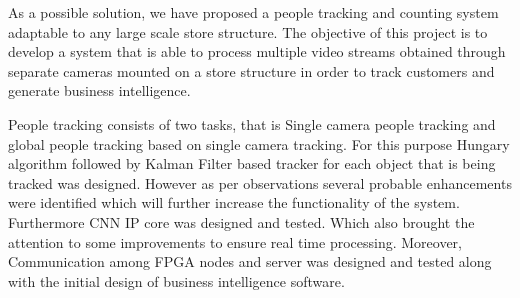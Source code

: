 \documentclass[12pt,a4paper]{report}
\begin{document}
\par As a possible solution, we have proposed a people tracking and counting system adaptable to any large scale store structure. The objective of this project is to develop a system that is able to process multiple video streams obtained through separate cameras mounted on a store structure in order to track customers and generate business intelligence.

\par People tracking consists of two tasks, that is Single camera people tracking and global people tracking based on single camera tracking. For this purpose Hungary algorithm followed by Kalman Filter based tracker for each object that is being tracked was designed. However as per observations several probable enhancements were identified which will further increase the functionality of the system. Furthermore CNN IP core was designed and tested. Which also brought the attention to some improvements to ensure real time processing. Moreover, Communication among FPGA nodes and server was designed and tested along with the initial design of business intelligence software.
\end{document}
